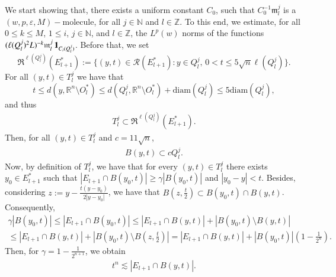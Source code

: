 \documentclass[11pt, a4paper,leqno]{amsart}
\newcommand{\mm}{\mathfrak{m}}
\renewcommand{\chi}{{\bf 1}}
\theoremstyle{plain}
\theoremstyle{definition}
\theoremstyle{remark}
\numberwithin{equation}{section}
\def \R{ \mathbb{R} }
\def \N{ \mathbb{N} }
\def \Z{ \mathbb{Z} }
\def \mol{ (w,p,\varepsilon,M)-\textrm{molecule}}
\begin{document}
We start showing that, there exists a uniform constant $C_0$, such that $C_0^{-1}\mm_{l}^{j}$ is a $\mol$, for all $j\in \N$ and $l\in \Z$. To this end, we estimate, for all $0\leq k\leq M$, $1\leq i$, $j\in \N$, and $l\in \Z$, the $L^p(w)$ norms of the functions $(\ell(Q_l^j)^2L)^{-k}\mm_{l}^{j}\,\chi_{C_i(Q_l^j)}$. Before that, we set 
$$
\mathfrak{R}^{\ell(Q_l^j)}(E_{l+1}^*)
:=
\big\{(y,t)\in \mathcal{R}(E_{l+1}^*):y\in Q_l^j,\,0<t\leq 5\sqrt{n}\ell(Q_l^j)\big\}.
$$
For all $(y,t)\in T_l^j$ we have that
$$
t\leq d(y,\R^n\setminus O^*_l)\leq d(Q_l^j,\R^n\setminus O^*_l)+
\textrm{diam}(Q_l^j)\leq 5\textrm{diam}(Q_l^j),
$$
and thus
\begin{align}\label{TcontainedinR}
T_l^j\subset \mathfrak{R}^{\ell(Q_l^j)}(E_{l+1}^*).
\end{align}
 Then,
 for all $(y,t)\in T_l^j$ and $c=11\sqrt{n}$,
\begin{align}\label{ballincube}
B(y,t)\subset cQ_l^j.
\end{align}
Now, by definition of $T_l^j$, we have that for every $(y,t)\in T_l^j$ there exists $y_0\in E_{l+1}^*$ such that $|E_{l+1}\cap B(y_0,t)|\geq \gamma |B(y_0,t)|$ and $|y_0-y|<t$. Besides,  considering $z:=y-\frac{t(y -y_0)}{2|y-y_0|}$, we have that $B\left(z,\frac{t}{2}\right)\subset B(y_0,t)\cap B(y,t)$. Consequently,
\begin{multline*}
\gamma |B(y_0,t)|\leq |E_{l+1}\cap B(y_0,t)|\leq |E_{l+1}\cap B(y,t)|+ |B(y_0,t)\setminus B(y,t)|
\\
\leq |E_{l+1}\cap B(y,t)|+ \left|B(y_0,t)\setminus B\left(z,\frac{t}{2}\right)\right|
= |E_{l+1}\cap B(y,t)|+ |B(y_0,t)|\left(1-\frac{1}{2^n}\right). \end{multline*}
Then, for $\gamma=1-\frac{1}{2^{n+1}}$, we obtain
\begin{align}\label{star}
t^n\lesssim |E_{l+1}\cap B(y ,t)|.
\end{align}
\end{document}
